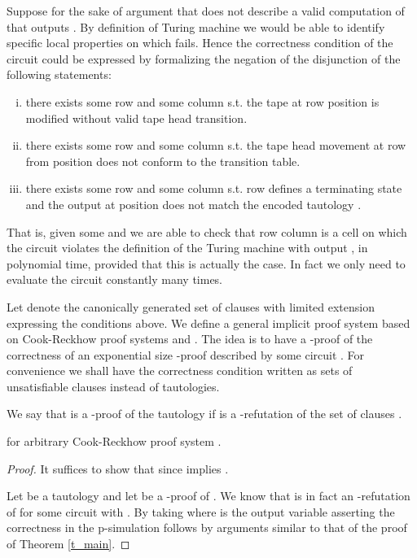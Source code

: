 \documentclass{LMCS}
\theoremstyle{plain}\newtheorem{satz}[thm]{Satz}
\begin{document}
Suppose for the sake of argument that  does not describe a valid computation of  that outputs . By definition of Turing machine we would be able to identify specific local properties on which  fails. Hence the correctness condition of the circuit  could be expressed by formalizing the negation of the disjunction of the following statements:
\begin{enumerate}[(i)]
\item
there exists some row  and some column  s.t. the tape at row  position  is modified without valid tape head transition.
\item
there exists some row  and some column  s.t. the tape head movement at row  from position  does not conform to the transition table.
\item
there exists some row  and some column  s.t. row  defines a terminating state and the output at position  does not match the encoded tautology .
\end{enumerate}

That is, given some  and  we are able to check that row  column  is a cell on which the circuit  violates the definition of the Turing machine  with output , in polynomial time, provided that this is actually the case. In fact we only need to evaluate the circuit  constantly many times.

Let  denote the canonically generated set of clauses with limited extension expressing the conditions above. We define a general implicit proof system  based on Cook-Reckhow proof systems  and . The idea is to have a -proof  of the correctness of an exponential size -proof described by some circuit . For convenience we shall have the correctness condition written as sets of unsatisfiable clauses instead of tautologies.

\begin{defi}
We say that  is a -proof of the tautology  if  is a -refutation of the set of clauses .
\end{defi}

\begin{thm}
\label{t_gen}
 for arbitrary Cook-Reckhow proof system .
\begin{proof}
It suffices to show that  since  implies .

Let  be a tautology and let  be a -proof of . We know that  is in fact an -refutation of  for some circuit  with . By taking  where  is the output variable asserting the correctness in  the p-simulation follows by arguments similar to that of the proof of Theorem \ref{t_main}.
\end{proof}
\end{thm}
\end{document}
